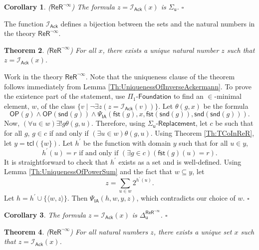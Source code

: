 \documentclass[11pt, a4paper]{article}
\newcounter{Theor1}
\newtheorem{theorem}{Theorem}[section]
\newtheorem{corollary}[theorem]{Corollary}
\newenvironment{proof}[1][Proof]{\begin{trivlist}
\item[\hskip \labelsep {\bfseries #1}]}{\end{trivlist}}
\begin{document}
\begin{corollary}
($\mathsf{ReR}^{\neg \infty}$) The formula $z= \mathcal{I}_{\mathsf{Ack}}(x)$ is $\Sigma_{\mathsf{u}}$. \hfill$\square$
\end{corollary}

The function $\mathcal{I}_{\mathsf{Ack}}$ defines a bijection between the sets and the natural numbers in the theory $\mathsf{ReR}^{\neg \infty}$.

\begin{theorem}
($\mathsf{ReR}^{\neg \infty}$) For all $x$, there exists a unique natural number $z$ such that $z= \mathcal{I}_{\mathsf{Ack}}(x)$.
\end{theorem}

\begin{proof}
Work in the theory $\mathsf{ReR}^{\neg \infty}$. Note that the uniqueness clause of the theorem follows immediately from Lemma \ref{Th:UniquenessOfInverseAckermann}. To prove the existence part of the statement, use $\Pi_1\textsf{-Foundation}$ to find an $\in$-minimal element, $w$, of the class $\{ v \mid \neg \exists z (z = \mathcal{I}_{\mathsf{Ack}}(v)) \}$. Let $\theta(g, x)$ be the formula
\[
\mathsf{OP}(g) \land \mathsf{OP}(\mathsf{snd}(g)) \land \Psi_{\mathsf{IA}}(\mathsf{fst}(g), x, \mathsf{fst}(\mathsf{snd}(g)), \mathsf{snd}(\mathsf{snd}(g))). 
\]
Now, $(\forall u \in w)\exists! g \theta(g, u)$. Therefore, using $\Sigma_{\mathsf{u}}\textsf{-Replacement}$, let $c$ be such that for all $g$, $g \in c$ if and only if $(\exists u \in w)\theta(g, u)$. Using Theorem \ref{Th:TCoInReR}, let $y= \mathsf{tcl}(\{w\})$. Let $h^\prime$ be the function with domain $y$ such that for all $u \in y$, 
\[
h^\prime(u)= r \textrm{ if and only if } (\exists g \in c)(\mathsf{fst}(g)(u)= r).
\]
It is straightforward to check that $h^\prime$ exists as a set and is well-defined. Using Lemma \ref{Th:UniquenessOfPowerSum} and the fact that $w \subseteq y$, let
\[
z= \sum_{u \in w} 2^{h^\prime(u)}.
\]
Let $h= h^\prime \cup \{\langle w, z \rangle\}$. Then $\Psi_{\mathsf{IA}}(h, w, y, z)$, which contradicts our choice of $w$. \hfill$\square$
\end{proof}

\begin{corollary}
The formula $z= \mathcal{I}_{\mathsf{Ack}}(x)$ is $\Delta_{\mathsf{u}}^{\mathsf{ReR}^{\neg \infty}}$. \hfill$\square$
\end{corollary}

\begin{theorem}
($\mathsf{ReR}^{\neg \infty}$) For all natural numbers $z$, there exists a unique set $x$ such that $z= \mathcal{I}_{\mathsf{Ack}}(x)$. 
\end{theorem}
\end{document}
